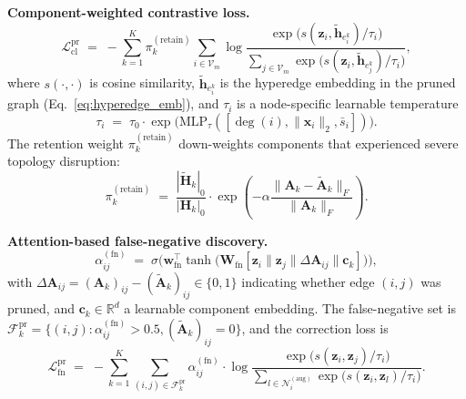 \documentclass[10pt]{article}
\theoremstyle{plain}
\theoremstyle{definition}
\begin{document}
\textbf{Component-weighted contrastive loss.}
\begin{equation}
\mathcal{L}_{\mathrm{cl}}^{\mathrm{pr}} \;=\;
-\sum_{k=1}^{K}\pi_k^{(\mathrm{retain})}
\sum_{i\in\mathcal{V}_m}
\log\frac{\exp\!\big(s(\mathbf{z}_i,
                       \widetilde{\mathbf{h}}_{e_i^{k}})/\tau_i\big)}
        {\sum_{j\in\mathcal{V}_m}
         \exp\!\big(s(\mathbf{z}_i,
                       \widetilde{\mathbf{h}}_{e_j^{k}})/\tau_i\big)},
\label{eq:L_cl_pr}
\end{equation}
where $s(\cdot,\cdot)$ is cosine similarity,
$\widetilde{\mathbf{h}}_{e_i^{k}}$ is the hyperedge embedding in the
pruned graph (Eq.~\eqref{eq:hyperedge_emb}), and $\tau_i$ is a
node-specific learnable temperature
\begin{equation}
\tau_i \;=\; \tau_0\cdot
\exp\!\big(\mathrm{MLP}_\tau([\deg(i),\|\mathbf{x}_i\|_2,\bar{s}_i])\big).
\label{eq:adaptive_temperature}
\end{equation}
The retention weight $\pi_k^{(\mathrm{retain})}$ down-weights
components that experienced severe topology disruption:
\begin{equation}
\pi_k^{(\mathrm{retain})} \;=\;
\frac{|\widetilde{\mathbf{H}}_k|_0}{|\mathbf{H}_k|_0}\cdot
\exp\!\left(-\alpha\frac{\|\mathbf{A}_k - \widetilde{\mathbf{A}}_k\|_F}
                              {\|\mathbf{A}_k\|_F}\right).
\label{eq:pi_retain}
\end{equation}

\textbf{Attention-based false-negative discovery.}
\begin{equation}
\alpha_{ij}^{(\mathrm{fn})} \;=\;
\sigma\!\Big(\mathbf{w}_{\mathrm{fn}}^{\top}
\tanh\!\big(\mathbf{W}_{\mathrm{fn}}
[\mathbf{z}_i\|\mathbf{z}_j\|
\Delta\mathbf{A}_{ij}\|\mathbf{c}_k]\big)\Big),
\label{eq:fn_attention}
\end{equation}
with $\Delta\mathbf{A}_{ij}=(\mathbf{A}_k)_{ij}-
(\widetilde{\mathbf{A}}_k)_{ij}\in\{0,1\}$ indicating whether edge $(i,j)$ was pruned, and $\mathbf{c}_k\in\mathbb{R}^{d}$ a learnable component embedding. The false-negative set is $\mathcal{F}_k^{\mathrm{pr}}=\{(i,j)\!:\alpha_{ij}^{(\mathrm{fn})}\!>0.5, (\widetilde{\mathbf{A}}_k)_{ij}\!=0\}$, and the correction loss is
\begin{equation}
\mathcal{L}_{\mathrm{fn}}^{\mathrm{pr}} \;=\;
-\sum_{k=1}^{K}
\sum_{(i,j)\in\mathcal{F}_k^{\mathrm{pr}}}
\alpha_{ij}^{(\mathrm{fn})}\cdot
\log\frac{\exp\!\big(s(\mathbf{z}_i,\mathbf{z}_j)/\tau_i\big)}
         {\sum_{l\in\mathcal{N}_i^{(\mathrm{aug})}}
          \exp\!\big(s(\mathbf{z}_i,\mathbf{z}_l)/\tau_i\big)}.
\label{eq:L_fn_pr}
\end{equation}
\end{document}
